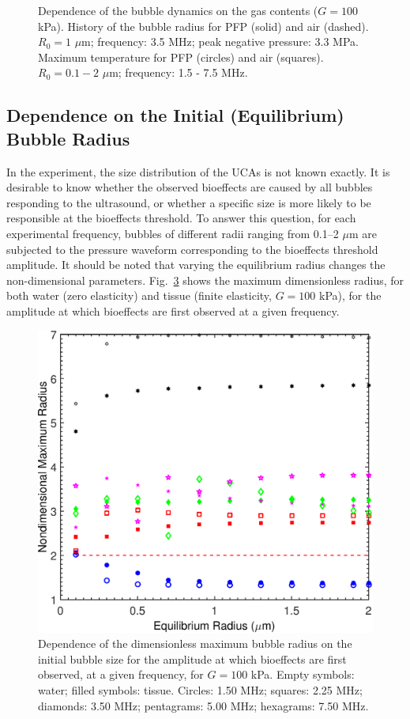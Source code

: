\begin{figure}[t]
\begin{subfigure}{0.47\textwidth}
    \caption[Maximum temperature for PFP and air]{}
    \label{fig:usbe_bubble_pfpair_temp}
  \end{subfigure}
  \caption{Dependence of the bubble dynamics on the gas contents
    ($G=100$ kPa).  History of
    the bubble radius for PFP (solid) and air (dashed). $R_0=1$
    $\mu$m; frequency: 3.5 MHz; peak negative pressure: 3.3
    MPa.  Maximum temperature for
    PFP (circles) and air (squares). $R_0=0.1-2$ $\mu$m; frequency:
    1.5 - 7.5 MHz.  }
  \label{fig:gascontents}
\end{figure}


\subsection{Dependence on the Initial (Equilibrium) Bubble Radius}

In the experiment, the size distribution of the UCAs is not known
exactly. It is desirable to know whether the observed bioeffects are
caused by all bubbles responding to the ultrasound, or whether a
specific size is more likely to be responsible at the bioeffects
threshold. To answer this question, for each experimental frequency,
bubbles of different radii ranging from 0.1--2 $\mu$m are subjected to
the pressure waveform corresponding to the bioeffects threshold
amplitude. It should be noted that varying the equilibrium radius
changes the non-dimensional parameters. Fig.~\ref{fig:size} shows the maximum dimensionless
radius, for both water (zero elasticity) and tissue (finite
elasticity, $G=100$ kPa), for the amplitude at which bioeffects are
first observed at a given frequency.

\begin{figure}[t]
  \centering
  \includegraphics[width=.47\textwidth]{figs/bubble_figs/Rstarmax_R0}
  \caption{Dependence of the dimensionless maximum
    bubble radius on the initial bubble size for the amplitude at
    which bioeffects are first observed, at a given frequency, for
    $G=100$ kPa. Empty symbols: water; filled symbols:
    tissue. Circles: 1.50 MHz; squares: 2.25 MHz; diamonds: 3.50
    MHz; pentagrams: 5.00 MHz; hexagrams: 7.50 MHz.}
  \label{fig:size}
\end{figure}

